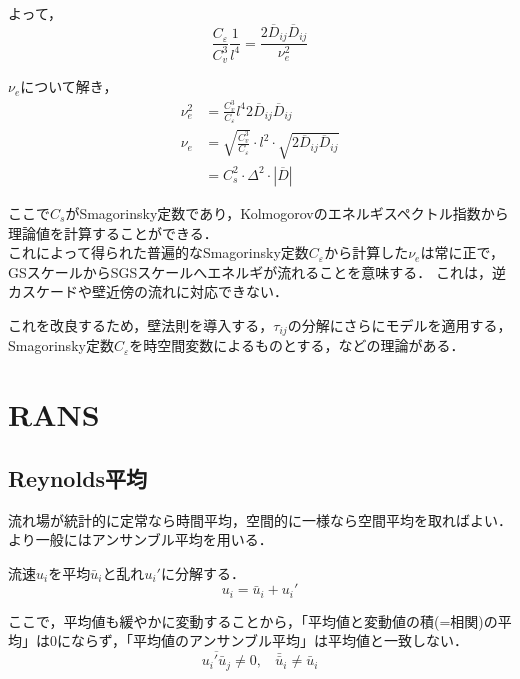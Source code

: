 \documentclass[12pt,a4paper]{jsarticle}
\begin{document}
よって，
\begin{equation}
  \frac{C_\varepsilon}{C_v^3} \frac{1}{l^4} = \frac{2 \overline{D}_{ij} \overline{D}_{ij}}{\nu_e^2}
\end{equation}

$\nu_e$について解き，
\begin{align}
  \nu_e^2 &= \frac{C_v^3}{C_\varepsilon} l^4 2 \overline{D}_{ij} \overline{D}_{ij} \nonumber \\
  \nu_e &= \sqrt{\frac{C_v^3}{C_\varepsilon}} \cdot l^2 \cdot \sqrt{2 \overline{D}_{ij} \overline{D}_{ij}} \nonumber \\
    &= C_s^2 \cdot \Delta^2 \cdot |\overline{D}| \tag{7.37}
\end{align}

ここで$C_s$がSmagorinsky定数であり，Kolmogorovのエネルギスペクトル指数から理論値を計算することができる．\\

これによって得られた普遍的なSmagorinsky定数$C_{\varepsilon}$から計算した$\nu_e$は常に正で，GSスケールからSGSスケールへエネルギが流れることを意味する．
これは，逆カスケードや壁近傍の流れに対応できない．

これを改良するため，壁法則を導入する，$\tau_{ij}$の分解にさらにモデルを適用する，Smagorinsky定数$C_{\varepsilon}$を時空間変数によるものとする，などの理論がある．

\clearpage
\section{RANS}
\label{sec:RANS}


\subsection{Reynolds平均}
\label{subsec:ReynoldsAverage}


流れ場が統計的に定常なら時間平均，空間的に一様なら空間平均を取ればよい．
より一般にはアンサンブル平均を用いる．

流速$u_i$を平均$\bar{u}_i$と乱れ$u_i'$に分解する．
\begin{equation}
  u_i = \bar{u}_i +u_i'
\label{eq:ReynoldsDecomposition}
\end{equation}

ここで，平均値も緩やかに変動することから，「平均値と変動値の積(=相関)の平均」は0にならず，「平均値のアンサンブル平均」は平均値と一致しない．
\begin{equation}
  \overline{u_i' \bar{u}_j} \ne 0, ~~~~ \bar{\bar{u}}_i \ne \bar{u}_i \tag{6.1}
  \label{eq:AverageofAverage}
\end{equation}
\end{document}
